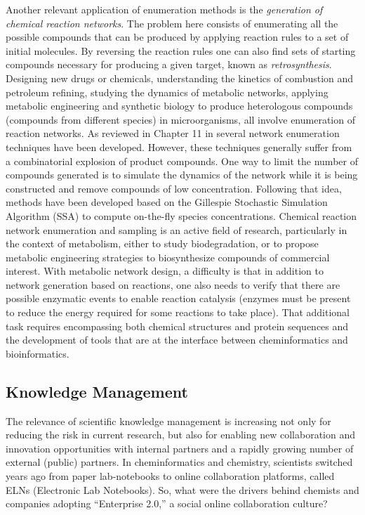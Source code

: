 \documentclass{../sig-alternate}
\begin{document}
Another relevant application of enumeration methods is the
\emph{generation of chemical reaction networks}. The problem here
consists of enumerating all the possible compounds that can be
produced by applying reaction rules to a set of initial molecules. By
reversing the reaction rules one can also find sets of starting
compounds necessary for producing a given target, known as
\emph{retrosynthesis}. Designing new drugs or chemicals, understanding
the kinetics of combustion and petroleum refining, studying the
dynamics of metabolic networks, applying metabolic engineering and
synthetic biology to produce heterologous compounds (compounds from
different species) in microorganisms, all involve enumeration of
reaction networks. As reviewed in Chapter 11 in \cite{faulon2010}
several network enumeration techniques have been developed. However,
these techniques generally suffer from a combinatorial explosion of
product compounds. One way to limit the number of compounds generated
is to simulate the dynamics of the network while it is being
constructed and remove compounds of low concentration. Following that
idea, methods have been developed based on the Gillespie Stochastic
Simulation Algorithm (SSA) to compute on-the-fly species
concentrations. Chemical reaction network enumeration and sampling is
an active field of research, particularly in the context of
metabolism, either to study biodegradation, or to propose metabolic
engineering strategies to biosynthesize compounds of commercial
interest. With metabolic network design, a difficulty is that in
addition to network generation based on reactions, one also needs to
verify that there are possible enzymatic events to enable reaction
catalysis (enzymes must be present to reduce the 
energy required for some reactions to take place). That additional
task requires encompassing both chemical structures and protein
sequences and the development of tools that are at the
interface between cheminformatics and bioinformatics.


\subsection{Knowledge Management}
\label{sec:knowledge-management}

The relevance of scientific knowledge management is increasing not
only for reducing the risk in current research, but also for enabling
new collaboration and innovation opportunities with internal partners and
a rapidly growing number of external (public) partners. In
cheminformatics and chemistry, scientists switched years ago
from paper lab-notebooks to online collaboration platforms, called
ELNs (Electronic Lab Notebooks). So, what were the drivers behind
chemists and companies adopting ``Enterprise 2.0,'' a social online
collaboration culture?
\end{document}
